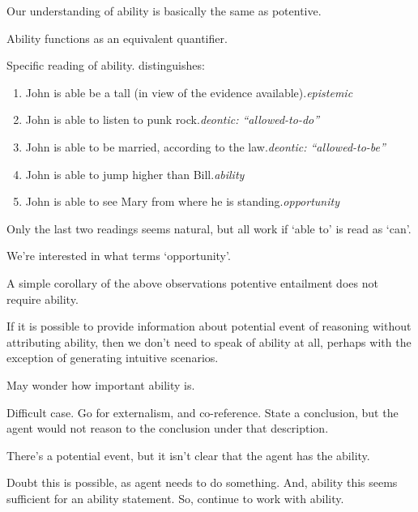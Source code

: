\begin{note}[Ability]
  Our understanding of ability is basically the same as potentive.

  Ability functions as an equivalent quantifier.

  Specific reading of ability.
  \textcite{Hackl:1998tt} distinguishes:
  {
    \small
    \begin{enumerate}
    \item John is able be a tall (in view of the evidence available).\hfill \emph{epistemic}
    \item John is able to listen to punk rock.\hfill \emph{deontic: ``allowed-to-do''}
    \item John is able to be married, according to the law.\hfill \emph{deontic: ``allowed-to-be''}
    \item John is able to jump higher than Bill.\hfill \emph{ability}
    \item John is able to see Mary from where he is standing.\hfill \emph{opportunity}
    \end{enumerate}
  }
  Only the last two readings seems natural, but all work if `able to' is read as `can'.

  We're interested in what \citeauthor{Hackl:1998tt} terms `opportunity'.
\end{note}

\begin{note}
  A simple corollary of the above observations potentive entailment does not require ability.

  If it is possible to provide information about potential event of reasoning without attributing ability, then we don't need to speak of ability at all, perhaps with the exception of generating intuitive scenarios.

  May wonder how important ability is.

  Difficult case.
  Go for externalism, and co-reference.
  State a conclusion, but the agent would not reason to the conclusion under that description.

  There's a potential event, but it isn't clear that the agent has the ability.

  Doubt this is possible, as agent needs to do something.
  And, ability this seems sufficient for an ability statement.
  So, continue to work with ability.
\end{note}

